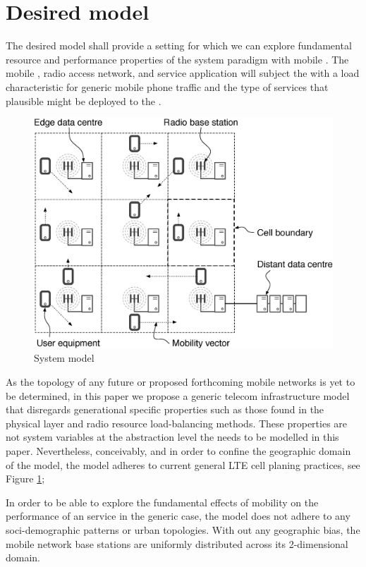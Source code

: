 \section{Desired model}

The desired model shall provide a setting for which we can explore fundamental resource and performance properties of the \xcloud{} system paradigm with mobile \ues{}. The mobile \ues{}, radio access network, and service application will subject the \dcs{} with a load characteristic for generic mobile phone traffic and the type of services that plausible might be deployed to the \xcloud{}.

\begin{figure}[tb]
	\centering
	\includegraphics[width=\linewidth]{fig_system_model.eps} 
	\caption{System model}
	\label{fig:system_model}
\end{figure}

As the topology of any future \xcloud{} or proposed forthcoming mobile networks is yet to be determined, in this paper we propose a generic telecom infrastructure model that disregards generational specific properties such as those found in the physical layer and radio resource load-balancing methods. These properties are not system variables at the abstraction level the \xcloud needs to be modelled in this paper. Nevertheless, conceivably, and in order to confine the geographic domain of the model, the model adheres to current general LTE cell planing practices, see Figure \ref{fig:system_model};

In order to be able to explore the fundamental effects of mobility on the performance of an \xcloud service in the generic case, the model does not adhere to any soci-demographic patterns or urban topologies. With out any geographic bias, the mobile network base stations are uniformly distributed across its 2-dimensional domain.

